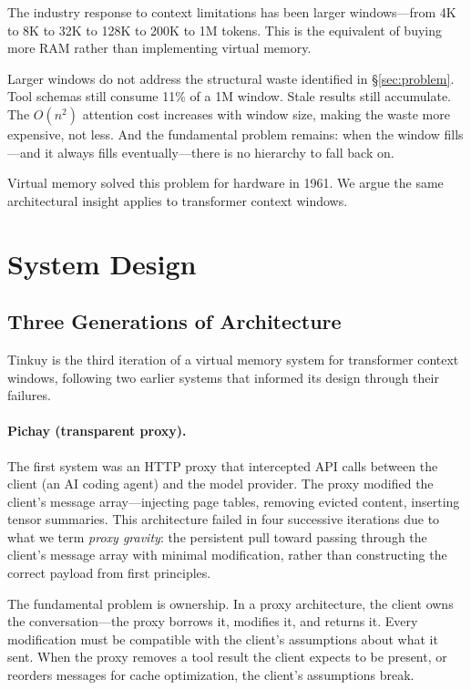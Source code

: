 \documentclass[sigplan,screen,anonymous]{acmart}
\begin{document}
The industry response to context limitations has been larger
windows---from 4K to 8K to 32K to 128K to 200K to 1M tokens.
This is the equivalent of buying more RAM rather than implementing
virtual memory.

Larger windows do not address the structural waste identified in
\S\ref{sec:problem}. Tool schemas still consume 11\% of a 1M window.
Stale results still accumulate. The $O(n^2)$ attention cost increases
with window size, making the waste more expensive, not less. And the
fundamental problem remains: when the window fills---and it always
fills eventually---there is no hierarchy to fall back on.

Virtual memory solved this problem for hardware in 1961. We argue
the same architectural insight applies to transformer context windows.


\section{System Design}

\subsection{Three Generations of Architecture}

Tinkuy is the third iteration of a virtual memory system for
transformer context windows, following two earlier systems that
informed its design through their failures.

\paragraph{Pichay (transparent proxy).}
The first system was an HTTP proxy that intercepted API calls between
the client (an AI coding agent) and the model provider. The proxy
modified the client's message array---injecting page tables, removing
evicted content, inserting tensor summaries. This architecture failed
in four successive iterations due to what we term \emph{proxy
gravity}: the persistent pull toward passing through the client's
message array with minimal modification, rather than constructing the
correct payload from first principles.

The fundamental problem is ownership. In a proxy architecture, the
client owns the conversation---the proxy borrows it, modifies it, and
returns it. Every modification must be compatible with the client's
assumptions about what it sent. When the proxy removes a tool result
the client expects to be present, or reorders messages for cache
optimization, the client's assumptions break.
\end{document}
